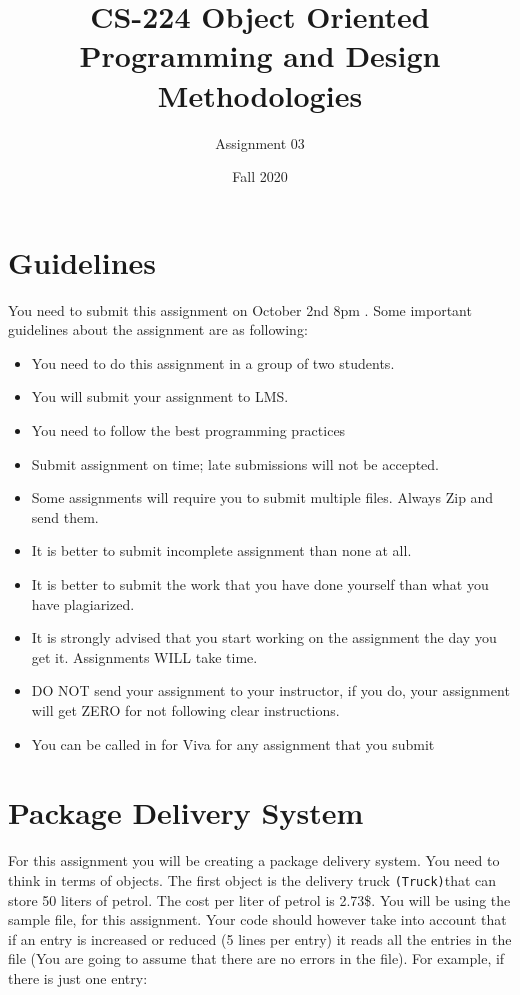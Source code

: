 \documentclass[a4paper,12pt]{article}
\begin{document}
	
	\title{CS-224 Object Oriented Programming and Design Methodologies }
	\author{Assignment 03}
	\date{Fall 2020}
	\maketitle
	\section{Guidelines}
	You need to submit this assignment on  {\color{red}October 2nd 8pm }. Some important guidelines about the assignment are as following:
	
	\begin{itemize}
		\item You need to do this assignment in a group of two students.
		\item You will submit your assignment to LMS. 
		\item You need to follow the best programming practices 
		\item Submit assignment on time; late submissions will not be accepted.
		\item Some assignments will require you to submit multiple files. Always Zip and send them.
		\item It is better to submit incomplete assignment than none at all.
		\item It is better to submit the work that you have done yourself than what you have plagiarized.
		\item It is strongly advised that you start working on the assignment the day you get it. Assignments WILL take time.
		\item DO NOT send your assignment to your instructor, if you do, your assignment will get ZERO for not following clear instructions.
		\item You can be called in for Viva for any assignment that you submit
	\end{itemize}
	

	
	\section{Package Delivery System}
	For this assignment you will be creating a package delivery system. You need to think in terms of objects.	The first object is the delivery truck \texttt{(Truck)}that can store 50 liters of petrol. The cost per liter of petrol is 2.73\$.	You will be using the sample file,  for this assignment. Your code should however take into account that if an entry is increased or reduced (5 lines per entry) it reads all the entries in the file (You are going to assume that there are no errors in the file). For example, if there is just one entry:\smallskip\\
	
\end{document}
